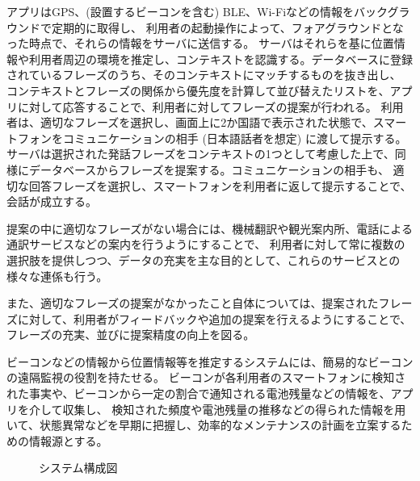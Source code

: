 \documentclass[11pt,papersize]{jsbook}
\begin{document}
アプリはGPS、(設置するビーコンを含む) BLE、Wi-Fiなどの情報をバックグラウンドで定期的に取得し、
利用者の起動操作によって、フォアグラウンドとなった時点で、それらの情報をサーバに送信する。
サーバはそれらを基に位置情報や利用者周辺の環境を推定し、コンテキストを認識する。データベースに登録されているフレーズのうち、そのコンテキストにマッチするものを抜き出し、
コンテキストとフレーズの関係から優先度を計算して並び替えたリストを、アプリに対して応答することで、利用者に対してフレーズの提案が行われる。
利用者は、適切なフレーズを選択し、画面上に2か国語で表示された状態で、スマートフォンをコミュニケーションの相手 (日本語話者を想定) に渡して提示する。
サーバは選択された発話フレーズをコンテキストの1つとして考慮した上で、同様にデータベースからフレーズを提案する。コミュニケーションの相手も、
適切な回答フレーズを選択し、スマートフォンを利用者に返して提示することで、会話が成立する。

提案の中に適切なフレーズがない場合には、機械翻訳や観光案内所、電話による通訳サービスなどの案内を行うようにすることで、
利用者に対して常に複数の選択肢を提供しつつ、データの充実を主な目的として、これらのサービスとの様々な連係も行う。

また、適切なフレーズの提案がなかったこと自体については、提案されたフレーズに対して、利用者がフィードバックや追加の提案を行えるようにすることで、
フレーズの充実、並びに提案精度の向上を図る。

ビーコンなどの情報から位置情報等を推定するシステムには、簡易的なビーコンの遠隔監視の役割を持たせる。
ビーコンが各利用者のスマートフォンに検知された事実や、ビーコンから一定の割合で通知される電池残量などの情報を、アプリを介して収集し、
検知された頻度や電池残量の推移などの得られた情報を用いて、状態異常などを早期に把握し、効率的なメンテナンスの計画を立案するための情報源とする。
\begin{figure}[htbp]
 \begin{center}
 \end{center}
 \caption{システム構成図}
 \label{fig:system_structure}
\end{figure}
\end{document}
